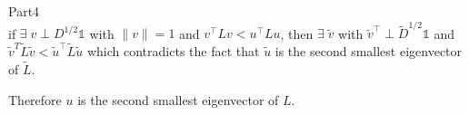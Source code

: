 \documentclass[12pt, a4]{report}
\begin{document}
Part4 \\
if $\exists \;  v \perp D^{1/2}\mathds{1}$ with $\|v\|=1$ and $v^{\top}Lv < u^{\top}Lu$, then $\exists \; \tilde{v}$ with $\tilde{v}^{\top} \perp \tilde{D}^{1/2}\mathds{1}$ and $\tilde{v}^T \tilde{L} \tilde{v} < \tilde{u}^{\top} \tilde{L} \tilde{u}$
which contradicts the fact that $\tilde{u}$ is the second smallest eigenvector of $\tilde{L}$. 

Therefore $u$ is the second smallest eigenvector of $L$. 
\end{document}
